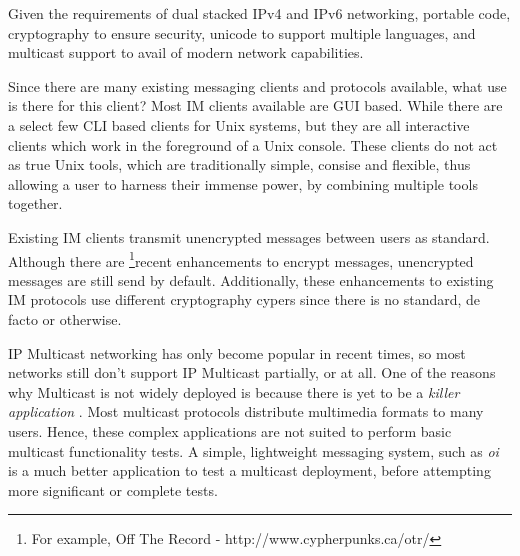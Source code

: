 
Given the requirements of dual stacked IPv4 and IPv6 networking,
portable code, cryptography to ensure security, unicode to support
multiple languages, and multicast support to avail of modern network
capabilities.


Since there are many existing messaging clients and protocols available,
what use is there for this client? Most IM clients available are GUI
based. While there are a select few CLI based clients for Unix systems,
but they are all interactive clients which work in the foreground of a
Unix console. These clients do not act as true Unix tools, which are
traditionally simple, consise and flexible, thus allowing a user to
harness their immense power, by combining multiple tools together.


Existing IM clients transmit unencrypted messages between users as
standard. Although there are 
\footnote{For example, Off The Record - http://www.cypherpunks.ca/otr/}{recent enhancements}
to encrypt messages, unencrypted messages are still send by default.
Additionally, these enhancements to existing IM protocols use different
cryptography cypers since there is no standard, de facto or otherwise.


IP Multicast networking has only become popular in recent times, so most
networks still don't support IP Multicast partially, or at all. One of
the reasons why Multicast is not widely deployed is because there is yet
to be a \emph{killer application} . Most multicast protocols distribute
multimedia formats to many users. Hence, these complex applications 
are not suited to perform basic multicast functionality tests. A simple,
lightweight messaging system, such as \emph{oi} is a much better  
application to test a multicast deployment, before attempting more
significant or complete tests.
